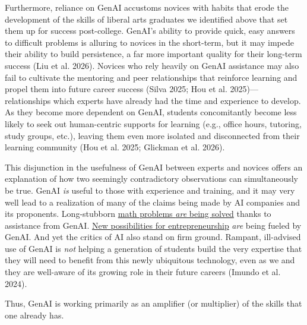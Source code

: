 \documentclass[
]{hdsr}
\begin{document}
Furthermore, reliance on GenAI accustoms novices with habits that erode
the development of the skills of liberal arts graduates we identified
above that set them up for success post-college. GenAI's ability to
provide quick, easy answers to difficult problems is alluring to novices
in the short-term, but it may impede their ability to build persistence,
a far more important quality for their long-term success (Liu et al.
2026). Novices who rely heavily on GenAI assistance may also fail to
cultivate the mentoring and peer relationships that reinforce learning
and propel them into future career success (Silva 2025; Hou et al.
2025)---relationships which experts have already had the time and
experience to develop. As they become more dependent on GenAI, students
concomitantly become less likely to seek out human-centric supports for
learning (e.g., office hours, tutoring, study groups, etc.), leaving
them even more isolated and disconnected from their learning community
(Hou et al. 2025; Glickman et al. 2026).

This disjunction in the usefulness of GenAI between experts and novices
offers an explanation of how two seemingly contradictory observations
can simultaneously be true. GenAI \emph{is} useful to those with
experience and training, and it may very well lead to a realization of
many of the claims being made by AI companies and its proponents.
Long-stubborn
\href{https://www.nytimes.com/2026/07/23/science/fields-medals-pardon-deng-wang-tsimerman.html}{math
problems \emph{are} being solved} thanks to assistance from GenAI.
\href{https://www.nytimes.com/2026/04/02/technology/ai-billion-dollar-company-medvi.html}{New
possibilities for entrepreneurship} \emph{are} being fueled by GenAI.
And yet the critics of AI also stand on firm ground. Rampant,
ill-advised use of GenAI is \emph{not} helping a generation of students
build the very expertise that they will need to benefit from this newly
ubiquitous technology, even as we and they are well-aware of its growing
role in their future careers (Imundo et al. 2024).

Thus, GenAI is working primarily as an amplifier (or multiplier) of the
skills that one already has.
\end{document}
